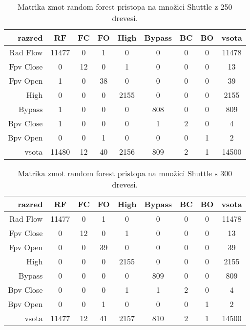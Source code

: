 \begin{table}[H]
    \centering
    \begin{tabular}{||rcccccccc||}
        \hline
        razred    & RF    & FC & FO & High & Bypass & BC & BO & vsota \\ \hline
        Rad Flow  & 11477 & 0  & 1  & 0    & 0      & 0  & 0  & 11478 \\ \hline
        Fpv Close & 0     & 12 & 0  & 1    & 0      & 0  & 0  & 13    \\ \hline
        Fpv Open  & 1     & 0  & 38 & 0    & 0      & 0  & 0  & 39    \\ \hline
        High      & 0     & 0  & 0  & 2155 & 0      & 0  & 0  & 2155  \\ \hline
        Bypass    & 1     & 0  & 0  & 0    & 808    & 0  & 0  & 809   \\ \hline
        Bpv Close & 1     & 0  & 0  & 0    & 1      & 2  & 0  & 4     \\ \hline
        Bpv Open  & 0     & 0  & 1  & 0    & 0      & 0  & 1  & 2     \\ \hline
        vsota     & 11480 & 12 & 40 & 2156 & 809    & 2  & 1  & 14500 \\ \hline
    \end{tabular}
    \caption{Matrika zmot random forest pristopa na množici Shuttle z 250 drevesi.}
    \label{tab:rforest_shuttle_cm_2}
\end{table}

\begin{table}[H]
    \centering
    \begin{tabular}{||r|ccccccc|c||}
        \hline
        razred    & RF    & FC & FO & High & Bypass & BC & BO & vsota \\ \hline
        Rad Flow  & 11477 & 0  & 1  & 0    & 0      & 0  & 0  & 11478 \\ \hline
        Fpv Close & 0     & 12 & 0  & 1    & 0      & 0  & 0  & 13    \\ \hline
        Fpv Open  & 0     & 0  & 39 & 0    & 0      & 0  & 0  & 39    \\ \hline
        High      & 0     & 0  & 0  & 2155 & 0      & 0  & 0  & 2155  \\ \hline
        Bypass    & 0     & 0  & 0  & 0    & 809    & 0  & 0  & 809   \\ \hline
        Bpv Close & 0     & 0  & 0  & 1    & 1      & 2  & 0  & 4     \\ \hline
        Bpv Open  & 0     & 0  & 1  & 0    & 0      & 0  & 1  & 2     \\ \hline
        vsota     & 11477 & 12 & 41 & 2157 & 810    & 2  & 1  & 14500 \\ \hline
    \end{tabular}
    \caption{Matrika zmot random forest pristopa na množici Shuttle s 300 drevesi.}
    \label{tab:rforest_shuttle_cm_3}
\end{table}